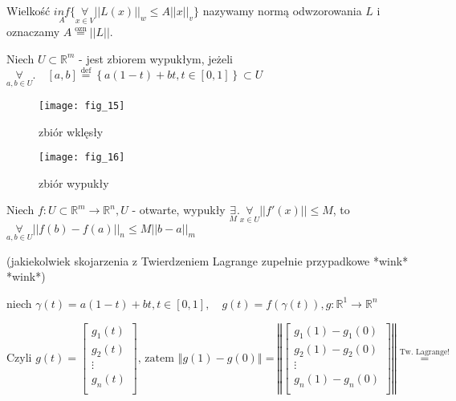 \documentclass[../main.tex]{subfiles}
\begin{document}
\begin{definicja}
    Wielkość $\underset{A}{inf} \{\underset{x\in V}{\forall}||L(x)||_w \leq A||x||_v\}$ nazywamy normą odwzorowania $L$ i oznaczamy $A\overset{\text{ozn}}{=}||L||$.
\end{definicja}
\begin{definicja}
    Niech $U\subset \mathbb{R}^m$ - jest zbiorem wypukłym, jeżeli $\underset{a,b\in U}{\forall}.\quad [a,b]\overset{\text{def}}{=} \left \{ a(1-t)+bt, t\in[0,1] \right \} \subset U$
\end{definicja}
\begin{figure}
    \centering
    \texttt{[image: fig\_15]}
    \caption{zbiór wklęsły}
\end{figure}
\begin{figure}
    \centering
    \texttt{[image: fig\_16]}
    \caption{zbiór wypukły}
\end{figure}
\begin{stw}
    Niech $f: U\subset \mathbb{R}^m \to \mathbb{R}^n, U$ - otwarte, wypukły
    $\underset{M}{\exists}.\underset{x\in U}{\forall}||f'(x)||\leq M$, to $\underset{a,b\in U}{\forall}||f(b)-f(a)||_n \leq M||b-a||_m$ \begin{tiny}(jakiekolwiek skojarzenia z Twierdzeniem Lagrange zupełnie przypadkowe *wink* *wink*)\end{tiny}
\end{stw}

\begin{dowod}

\end{dowod}
niech $\gamma (t) = a(1-t) + bt, t\in [0,1], \quad g(t) = f(\gamma (t)),g: \mathbb{R}^1 \to \mathbb{R}^n$

$$\text{Czyli }g(t) = \left [ \begin{matrix}
g_1(t)\\
g_2(t)\\
\vdots\\
g_n(t)\\ \end{matrix}\right ] \text{, zatem } \left \Vert g(1)-g(0)\right \Vert = \left \Vert \left [ \begin{matrix}
g_1(1) - g_1(0)\\
g_2(1) - g_2(0)\\
\vdots\\
g_n(1) - g_n(0)\\ \end{matrix}\right ] \right \Vert \overset{\text{Tw. Lagrange!}}{=} $$
\end{document}
